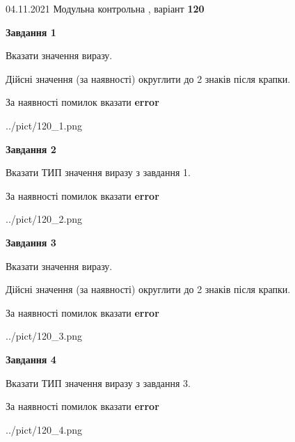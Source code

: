 \documentclass[11pt, ukrainian]{article}
\begin{document}
{04.11.2021 Модульна контрольна , варіант  \No \textbf { 120 }\par}
{
\begin {large}
{\begin {center}\textbf{Завдання 1}\end {center}}\par
Вказати значення виразу. \par
Дійсні значення (за наявності) округлити до 2 знаків після крапки. \par
За наявності помилок вказати \textbf{error}

\begin{center}
	{../pict/120_1.png}
\end{center}
\newpage

{\begin {center}\textbf{Завдання 2}\end {center}}\par
Вказати ТИП значення виразу з завдання 1. \par
За наявності помилок вказати \textbf{error}

\begin{center}
	{../pict/120_2.png}
\end{center}
\newpage

{\begin {center}\textbf{Завдання 3}\end {center}}\par
Вказати значення виразу. \par
Дійсні значення (за наявності) округлити до 2 знаків після крапки. \par
За наявності помилок вказати \textbf{error}

\begin{center}
	{../pict/120_3.png}
\end{center}
\newpage

{\begin {center}\textbf{Завдання 4}\end {center}}\par
Вказати ТИП значення виразу з завдання 3. \par
За наявності помилок вказати \textbf{error}

\begin{center}
	{../pict/120_4.png}
\end{center}
\newpage


\end{large}}
\end{document}
